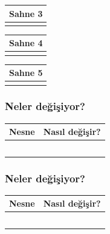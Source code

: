 \documentclass[12pt, a4paper]{article}
\begin{document}
\vspace{5ex}
\noindent
\begin{tabular}{| p{16.5cm}  |  }
\hline			
Sahne 3\\
\hline
 \\[50ex]
\hline  
\end{tabular}

\vspace{5ex}
\noindent
\begin{tabular}{| p{16.5cm}  |  }
\hline			
Sahne 4\\
\hline
 \\[50ex]
\hline  
\end{tabular}

\vspace{5ex}
\noindent
\begin{tabular}{| p{16.5cm}  |  }
\hline			
Sahne 5\\
\hline
 \\[50ex]
\hline  
\end{tabular}

\vspace{5ex}

\subsubsection*{Neler değişiyor?}
\begin{tabular}{| p{4cm} | p{11cm} |  }
\hline			
Nesne&Nasıl değişir?\\
\hline
& \\[6ex]
\hline  
& \\[6ex]
\hline  
& \\[6ex]
\hline  
& \\[6ex]
\hline  
& \\[6ex]
\hline  
\end{tabular}


\subsubsection*{Neler değişiyor?}
\begin{tabular}{| p{4cm} | p{11cm} |  }
\hline			
Nesne&Nasıl değişir?\\
\hline
& \\[6ex]
\hline  
& \\[6ex]
\hline  
& \\[6ex]
\hline  
& \\[6ex]
\hline  
& \\[6ex]
\hline  
\end{tabular}
\end{document}
